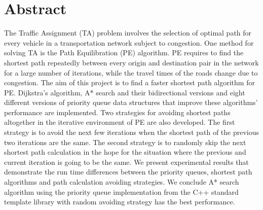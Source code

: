 \chapter*{Abstract}
\thispagestyle{empty}
The Traffic Assignment (TA) problem involves the selection of optimal path for every vehicle in a transportation network subject to congestion.
One method for solving TA is the Path Equilibration (PE) algorithm.
PE requires to find the shortest path repeatedly between every origin and destination pair in the network for a large number of iterations,
while the travel times of the roads change due to congestion.
The aim of this project is to find a faster shortest path algorithm for PE.
Dijkstra's algorithm, A* search and their bidirectional versions and eight different versions of priority queue data structures that improve these algorithms' performance are implemented.
Two strategies for avoiding shortest paths altogether in the iterative environment of PE are also developed.
The first strategy is to avoid the next few iterations when the shortest path of the previous two iterations are the same.
The second strategy is to randomly skip the next shortest path calculation in the hope for the situation where the previous and current iteration is going to be the same.
We present experimental results that demonstrate the run time differences between the priority queues, shortest path algorithms and path calculation avoiding strategies.
We conclude A* search algorithm using the priority queue implementation from the C++ standard template library with random avoiding strategy has the best performance.
